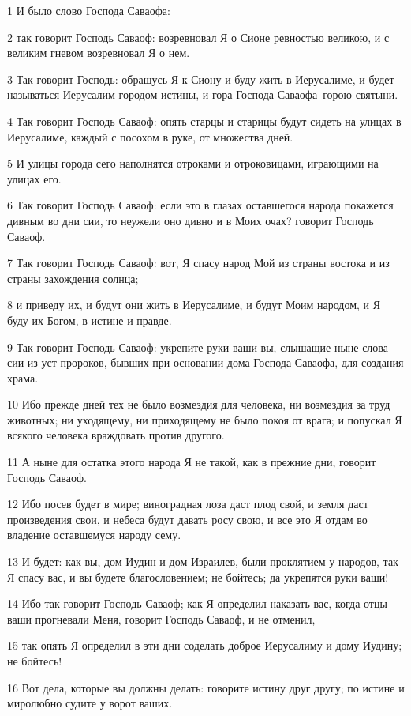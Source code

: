 \par 1 И было слово Господа Саваофа:
\par 2 так говорит Господь Саваоф: возревновал Я о Сионе ревностью великою, и с великим гневом возревновал Я о нем.
\par 3 Так говорит Господь: обращусь Я к Сиону и буду жить в Иерусалиме, и будет называться Иерусалим городом истины, и гора Господа Саваофа--горою святыни.
\par 4 Так говорит Господь Саваоф: опять старцы и старицы будут сидеть на улицах в Иерусалиме, каждый с посохом в руке, от множества дней.
\par 5 И улицы города сего наполнятся отроками и отроковицами, играющими на улицах его.
\par 6 Так говорит Господь Саваоф: если это в глазах оставшегося народа покажется дивным во дни сии, то неужели оно дивно и в Моих очах? говорит Господь Саваоф.
\par 7 Так говорит Господь Саваоф: вот, Я спасу народ Мой из страны востока и из страны захождения солнца;
\par 8 и приведу их, и будут они жить в Иерусалиме, и будут Моим народом, и Я буду их Богом, в истине и правде.
\par 9 Так говорит Господь Саваоф: укрепите руки ваши вы, слышащие ныне слова сии из уст пророков, бывших при основании дома Господа Саваофа, для создания храма.
\par 10 Ибо прежде дней тех не было возмездия для человека, ни возмездия за труд животных; ни уходящему, ни приходящему не было покоя от врага; и попускал Я всякого человека враждовать против другого.
\par 11 А ныне для остатка этого народа Я не такой, как в прежние дни, говорит Господь Саваоф.
\par 12 Ибо посев будет в мире; виноградная лоза даст плод свой, и земля даст произведения свои, и небеса будут давать росу свою, и все это Я отдам во владение оставшемуся народу сему.
\par 13 И будет: как вы, дом Иудин и дом Израилев, были проклятием у народов, так Я спасу вас, и вы будете благословением; не бойтесь; да укрепятся руки ваши!
\par 14 Ибо так говорит Господь Саваоф; как Я определил наказать вас, когда отцы ваши прогневали Меня, говорит Господь Саваоф, и не отменил,
\par 15 так опять Я определил в эти дни соделать доброе Иерусалиму и дому Иудину; не бойтесь!
\par 16 Вот дела, которые вы должны делать: говорите истину друг другу; по истине и миролюбно судите у ворот ваших.
